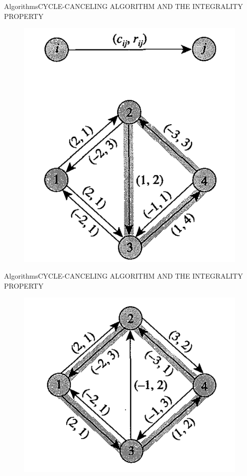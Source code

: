 \documentclass{beamer}
\begin{document}
\begin{frame}{Algorithms}{CYCLE-CANCELING ALGORITHM AND THE
  INTEGRALITY PROPERTY}
  \begin{figure}[h!t]
    \centering
    \includegraphics[scale = 0.3]{figura2canceling.png}
    \end{figure}
\end{frame}
\begin{frame}{Algorithms}{CYCLE-CANCELING ALGORITHM AND THE
  INTEGRALITY PROPERTY}
  \begin{figure}[h!t]
    \centering
    \includegraphics[scale = 0.4]{figura3canceling.png}
    \end{figure}
\end{frame}
\end{document}
